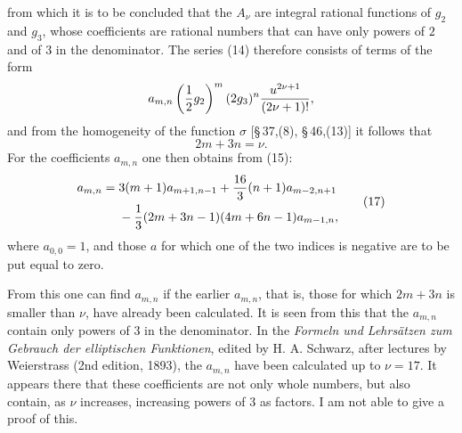 \documentclass[11pt]{article}
\begin{document}
from which it is to be concluded that the $A_\nu$ are integral rational functions of $g_2$ and $g_3$, whose coefficients are rational numbers that can have only powers of $2$ and of $3$ in the denominator. The series (14) therefore consists of terms of the form
\[
a_{m,n}\left({1\over2}g_2\right)^m(2g_3)^n{u^{2\nu+1}\over(2\nu+1)!},
\]
and from the homogeneity of the function $\sigma$ [\S\,37,(8), \S\,46,(13)] it follows that
\begin{equation}
2m+3n=\nu.
\tag{16}
\end{equation}
For the coefficients $a_{m,n}$ one then obtains from (15):
\begin{equation}
\begin{aligned}
a_{m,n}={}&3(m+1)a_{m+1,n-1}+{16\over3}(n+1)a_{m-2,n+1}\\
&-{1\over3}(2m+3n-1)(4m+6n-1)a_{m-1,n},
\end{aligned}
\tag{17}
\end{equation}
where $a_{0,0}=1$, and those $a$ for which one of the two indices is negative are to be put equal to zero.

From this one can find $a_{m,n}$ if the earlier $a_{m,n}$, that is, those for which $2m+3n$ is smaller than $\nu$, have already been calculated. It is seen from this that the $a_{m,n}$ contain only powers of $3$ in the denominator. In the \emph{Formeln und Lehrs\"atzen zum Gebrauch der elliptischen Funktionen}, edited by H. A. Schwarz, after lectures by Weierstrass (2nd edition, 1893), the $a_{m,n}$ have been calculated up to $\nu=17$. It appears there that these coefficients are not only whole numbers, but also contain, as $\nu$ increases, increasing powers of $3$ as factors. I am not able to give a proof of this.
\end{document}
